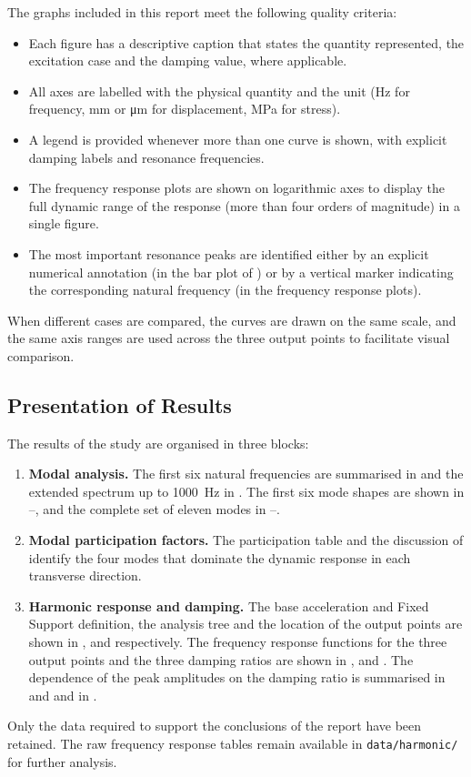 The graphs included in this report meet the following quality criteria:

\begin{itemize}
    \item Each figure has a descriptive caption that states the quantity represented, the excitation case and the damping value, where applicable.
    \item All axes are labelled with the physical quantity and the unit (\si{\hertz} for frequency, \si{\milli\metre} or \si{\micro\metre} for displacement, \si{\mega\pascal} for stress).
    \item A legend is provided whenever more than one curve is shown, with explicit damping labels and resonance frequencies.
    \item The frequency response plots are shown on logarithmic axes to display the full dynamic range of the response (more than four orders of magnitude) in a single figure.
    \item The most important resonance peaks are identified either by an explicit numerical annotation (in the bar plot of ) or by a vertical marker indicating the corresponding natural frequency (in the frequency response plots).
\end{itemize}

When different cases are compared, the curves are drawn on the same scale, and the same axis ranges are used across the three output points to facilitate visual comparison.

\subsection{Presentation of Results}

The results of the study are organised in three blocks:

\begin{enumerate}
    \item \textbf{Modal analysis.} The first six natural frequencies are summarised in  and the extended spectrum up to \SI{1000}{\hertz} in . The first six mode shapes are shown in --, and the complete set of eleven modes in --.
    \item \textbf{Modal participation factors.} The participation table  and the discussion of  identify the four modes that dominate the dynamic response in each transverse direction.
    \item \textbf{Harmonic response and damping.} The base acceleration and Fixed Support definition, the analysis tree and the location of the output points are shown in ,  and  respectively. The frequency response functions for the three output points and the three damping ratios are shown in ,  and . The dependence of the peak amplitudes on the damping ratio is summarised in  and  and in .
\end{enumerate}

Only the data required to support the conclusions of the report have been retained. The raw frequency response tables remain available in \texttt{data/harmonic/} for further analysis.
